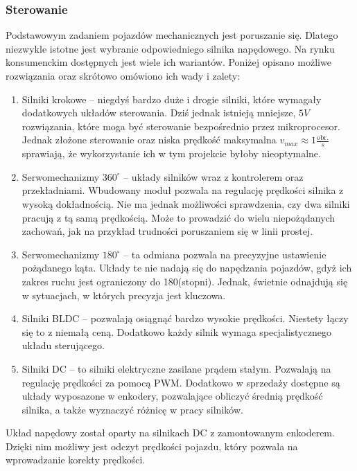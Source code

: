         \subsubsection{Sterowanie}
        \label{sec:engines}
            Podstawowym zadaniem pojazdów mechanicznych jest poruszanie się.
            Dlatego niezwykle istotne jest wybranie odpowiedniego silnika napędowego.
            Na rynku konsumenckim dostępnych jest wiele ich wariantów.
            Poniżej opisano możliwe rozwiązania oraz skrótowo omówiono ich wady i zalety:
            \begin{enumerate}
                \item Silniki krokowe -- niegdyś bardzo duże i drogie silniki, które wymagały dodatkowych układów sterowania.
                Dziś jednak istnieją mniejsze, $5V$ rozwiązania, które moga być sterowanie bezpośrednio przez mikroprocesor.
                Jednak złożone sterowanie oraz niska prędkość maksymalna $v_{max} \approx 1 \frac{\text{obr.}}{s}$ sprawiają, że wykorzystanie ich w tym projekcie byłoby nieoptymalne.
                \item Serwomechanizmy $360^\circ$ -- układy silników wraz z kontrolerem oraz przekładniami. Wbudowany moduł pozwala na regulację prędkości silnika z wysoką dokładnością.
                Nie ma jednak możliwości sprawdzenia, czy dwa silniki pracują z tą samą prędkością. Może to prowadzić do wielu niepożądanych zachowań, jak na przykład trudności poruszaniem się w linii prostej.
                \item Serwomechanizmy $180^\circ$ -- ta odmiana pozwala na precyzyjne ustawienie pożądanego kąta.
                Układy te nie nadają się do napędzania pojazdów, gdyż ich zakres ruchu jest ograniczony do 180(stopni). Jednak, świetnie odnajdują się w sytuacjach, w których precyzja jest kluczowa.
                \item Silniki BLDC -- pozwalają osiągnąć bardzo wysokie prędkości.
                Niestety łączy się to z niemałą ceną. Dodatkowo każdy silnik wymaga specjalistycznego układu sterującego.
                \item Silniki DC -- to silniki elektryczne zasilane prądem stałym. Pozwalają na regulację prędkości za pomocą PWM.
                Dodatkowo w sprzedaży dostępne są układy wyposazone w enkodery, pozwalające obliczyć średnią prędkość silnika,
                a także wyznaczyć różnicę w pracy silników.
            \end{enumerate}
            Układ napędowy został oparty na silnikach DC z zamontowanym enkoderem. Dzięki nim możliwy jest odczyt prędkości pojazdu, który pozwala na wprowadzanie korekty prędkości.
